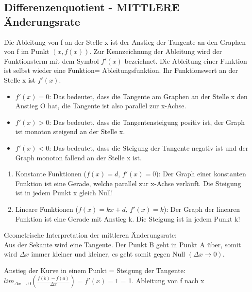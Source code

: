 \newpage
\subsection{Differenzenquotient - MITTLERE Änderungsrate}

\hfill \break
Die Ableitung von f an der Stelle x ist der Anstieg der Tangente an den Graphen von f im Punkt $(x,f(x))$. Zur
Kennzeichnung der Ableitung wird der Funktionsterm mit dem Symbol $f'(x)$ bezeichnet.
Die Ableitung einer Funktion ist selbst wieder eine Funktion= Ableitungsfunktion. Ihr Funktionswert an der
Stelle x ist $f'(x)$.

\begin{itemize}
    \item $f'(x) = 0$: Das bedeutet, dass die Tangente am Graphen an der Stelle x den Anstieg O hat, die
          Tangente ist also parallel zur x-Achse.
    \item $f'(x) > 0$: Das bedeutet, dass die Tangentensteigung positiv ist, der Graph ist monoton steigend an
          der Stelle x.
    \item $f'(x) < 0$: Das bedeutet, dass die Steigung der Tangente negativ ist und der Graph monoton fallend
          an der Stelle x ist.
\end{itemize}

\begin{enumerate}
    \item Konstante Funktionen ($f(x) = d$, $f'(x) = 0$): Der Graph einer konstanten Funktion ist
          eine Gerade, welche parallel zur x-Achse
          verläuft. Die Steigung ist in jedem Punkt x
          gleich Null!
    \item Lineare Funktionen ($f(x) = kx + d$, $f'(x) = k$): Der Graph der linearen Funktion ist eine
          Gerade mit Anstieg k. Die Steigung ist in
          jedem Punkt k!
\end{enumerate}

\hfill \break
Geometrische Interpretation der mittleren Änderungsrate:\\
Aus der Sekante wird eine Tangente. Der Punkt B geht
in Punkt A über, somit wird $\Delta x$ immer kleiner und
kleiner, es geht somit gegen Null $(\Delta x \rightarrow 0)$.

\hfill \break
Anstieg der Kurve in einem Punkt = Steigung der Tangente:\\
$lim_{\Delta x \rightarrow 0}(\frac{f(b)-f(a)}{\Delta x}) = f'(x) = 1$ = 1. Ableitung von f nach x

